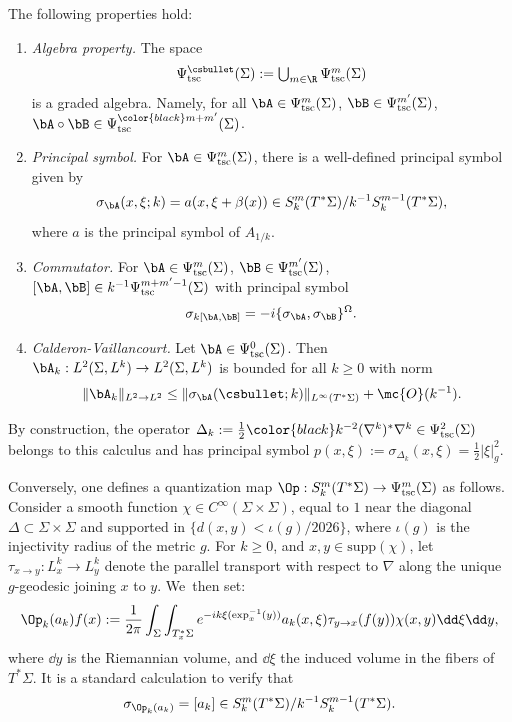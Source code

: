 \begin{proposition}
The following properties hold:

\begin{enumerate}

\item \emph{Algebra property.} The space
\[\textstyle
\Psi^\csbullet_{\mathrm{tsc}}(\Sigma) := \bigcup_{m \in \R} \Psi^m_{\mathrm{tsc}}(\Sigma)
\]
is a graded algebra. Namely, for all $\bA\in\Psi^m_{\mathrm{tsc}}(\Sigma)$, $\bB\in\Psi^{m'}_{\mathrm{tsc}}(\Sigma)$, $\bA \circ \bB \in \Psi^{\color{black}m+m'}_{\mathrm{tsc}}(\Sigma)$.

\item \emph{Principal symbol.} For $\bA \in \Psi^m_{\mathrm{tsc}}(\Sigma)$, there is a well-defined principal symbol given by
\[
\sigma_{\bA}(x,\xi ; k) = a(x,\xi + \beta(x)) \in
S^m_{k}(T^*\Sigma)/k^{-1}S^{m-1}_{k}(T^*\Sigma),
\]
where $a$ is the principal symbol of $A_{1/k}$.

\item \emph{Commutator.} For $\bA \in \Psi^m_{\mathrm{tsc}}(\Sigma)$, $\bB \in \Psi^{m'}_{\mathrm{tsc}}(\Sigma)$, $[\bA,\bB] \in k^{-1}\Psi^{m+m'-1}_{\mathrm{tsc}}(\Sigma)$ with principal symbol
\[
\sigma_{k[\bA,\bB]} = -i \{\sigma_{\bA},\sigma_{\bB}\}^\Omega.
\]

\item \emph{Calderon-Vaillancourt.} Let $\bA \in \Psi^0_{\mathrm{tsc}}(\Sigma)$. Then $\bA_k : L^2(\Sigma,L^k) \to L^2(\Sigma,L^k)$ is bounded for all $k \geq 0$ with norm
\[
\|\bA_k\|_{L^2 \to L^2} \leq \|\sigma_{\bA}(\csbullet;k)\|_{L^\infty(T^*\Sigma)} + \mc{O}(k^{-1}).
\]

\end{enumerate}

\end{proposition}

By construction, the operator $\Delta_k := \tfrac{1}{2} {\color{black}k^{-2}} (\nabla^k)^*\nabla^k \in \Psi^2_{\mathrm{tsc}}(\Sigma)$ belongs to this calculus and has principal symbol $p(x,\xi) := \sigma_{\Delta_k}(x,\xi) = \tfrac{1}{2}|\xi|^2_g$.

Conversely, one defines a quantization map $\Op : S^m_{k}(T^*\Sigma) \to \Psi^m_{\mathrm{tsc}}(\Sigma)$ as follows. Consider a smooth function $\chi \in C^\infty(\Sigma \times \Sigma)$, equal to $1$ near the diagonal $\Delta \subset \Sigma \times \Sigma$ and supported in $\{d(x,y) < \iota(g)/2026\}$, where $\iota(g)$ is the injectivity radius of the metric $g$. For $k \geq 0$, and $x,y \in \mathrm{supp}(\chi)$, let $\tau_{x \to y} : L^k_x \to L^k_y$ denote the parallel transport with respect to $\nabla$ along the unique $g$-geodesic joining $x$ to $y$. We~then set:
\[
\Op_{k}(a_{k}) f(x) := \dfrac{1}{2\pi} \int_{\Sigma} \int_{T^*_x\Sigma} e^{-ik\xi(\exp^{-1}_x(y))} a_{k}(x,\xi) \tau_{y \to x}(f(y)) \chi(x,y) \dd\xi \dd y,
\]
where $\dd y$ is the Riemannian volume, and $\dd\xi$ the induced volume in the fibers of $T^*\Sigma$. It is a standard calculation to verify that
\[
\sigma_{\Op_{k}(a_{k})} = [a_{k}] \in S^m_{k}(T^*\Sigma)/k^{-1}S^{m-1}_{k}(T^*\Sigma).
\]

